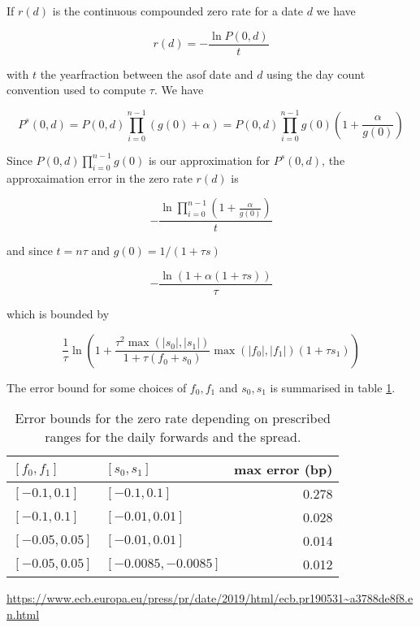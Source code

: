 \documentclass[12pt, a4paper]{article}
\begin{document}
If $r(d)$ is the continuous compounded zero rate for a date $d$ we have

\begin{equation}
 r(d) = - \frac{\ln P(0,d)}{t}
\end{equation}

with $t$ the yearfraction between the asof date and $d$ using the day count convention used to compute $\tau$. We have

\begin{equation}
P^s(0,d) = P(0,d) \prod_{i=0}^{n-1} (g(0) + \alpha) = P(0,d) \prod_{i=0}^{n-1} g(0) \left( 1 + \frac{\alpha}{g(0)} \right)
\end{equation}

Since $P(0,d) \prod_{i=0}^{n-1} g(0)$ is our approximation for $P^s(0,d)$, the approxaimation error in the zero rate
$r(d)$ is

\begin{equation}
-\frac{\ln \prod_{i=0}^{n-1}  \left( 1 + \frac{\alpha}{g(0)} \right)}{t}
\end{equation}

and since $t = n \tau$ and $g(0) = 1 / ( 1 + \tau s )$

\begin{equation}
 -\frac{ \ln ( 1 + \alpha ( 1+\tau s ))} { \tau }
\end{equation}

which is bounded by

\begin{equation}\label{error_bound}
  \frac{1}{\tau} \ln \left( 1 + \frac{\tau^2 \max(|s_0|, |s_1|)}{1+\tau(f_0+s_0)} \max(|f_0|, |f_1|)  ( 1+\tau s_1 ) \right)
\end{equation}

The error bound for some choices of $f_0, f_1$ and $s_0, s_1$ is summarised in table \ref{sample_error_bounds}.

\begin{table}[!htbp]
  \begin{tabular}{l | l | r}
    $[f_0, f_1]$ & $[s_0, s_1]$ & max error (bp) \\ \hline
    $[-0.1, 0.1]$ & $[-0.1, 0.1]$ &  0.278 \\
    $[-0.1, 0.1]$ & $[-0.01, 0.01]$ &  0.028 \\
    $[-0.05, 0.05]$ & $[-0.01, 0.01]$ &  0.014 \\
    $[-0.05, 0.05]$ & $[-0.0085, -0.0085]$ &  0.012 \\
  \end{tabular}
  \caption{Error bounds for the zero rate depending on prescribed ranges for the daily forwards and the spread.}
  \label{sample_error_bounds}
\end{table}

\begin{thebibliography}{*}
 \url{https://www.ecb.europa.eu/press/pr/date/2019/html/ecb.pr190531~a3788de8f8.en.html}
\end{thebibliography}
  
\end{document}
